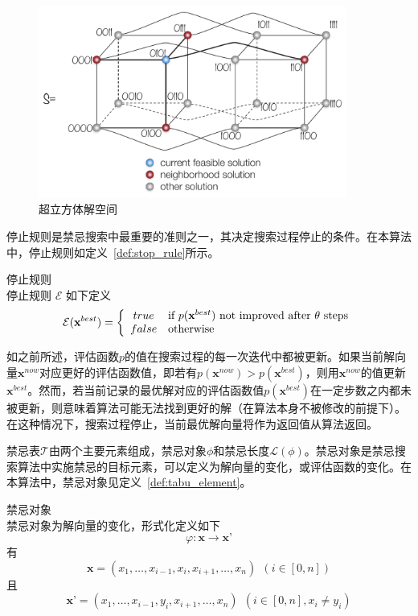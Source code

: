 \begin{figure}[!t]
\centering
\includegraphics[width=4.0in]{paper-MPAR/hypercube}
\caption{超立方体解空间}
\label{fig:chap3_hypercube}
\end{figure}

停止规则是禁忌搜索中最重要的准则之一，其决定搜索过程停止的条件。在本算法中，停止规则如定义~\ref{def:stop_rule}所示。

\begin{definition}停止规则\\
停止规则 $\mathcal{E}$ 如下定义
\[
\mathcal{E}(\textbf{x}^{best})=\left\{
\begin{array}{cl}
true & \textnormal{if $p(\textbf{x}^{best})$ not improved after $\theta$ steps} \\
false & \textnormal{otherwise}
\end{array}\right.
\]
\label{def:stop_rule}
\end{definition}

如之前所述，评估函数$p$的值在搜索过程的每一次迭代中都被更新。如果当前解向量$\bm{x}^{now}$对应更好的评估函数值，即若有$p(\bm{x}^{now})>p(\bm{x}^{best})$，则用$\bm{x}^{now}$的值更新$\bm{x}^{best}$。然而，若当前记录的最优解对应的评估函数值$p(\bm{x}^{best})$在一定步数之内都未被更新，则意味着算法可能无法找到更好的解（在算法本身不被修改的前提下）。在这种情况下，搜索过程停止，当前最优解向量将作为返回值从算法返回。

禁忌表$\mathcal{T}$由两个主要元素组成，禁忌对象$\phi$和禁忌长度$\mathcal{L}(\phi)$。禁忌对象是禁忌搜索算法中实施禁忌的目标元素，可以定义为解向量的变化，或评估函数的变化。在本算法中，禁忌对象见定义~\ref{def:tabu_element}。

\begin{definition}禁忌对象\\
禁忌对象为解向量的变化，形式化定义如下
\[
\varphi:\textbf{x}\rightarrow\textbf{x'}
\]
有
\[
\textbf{x}=(x_1,\ldots,x_{i-1},x_i,x_{i+1},\ldots,x_n)~~(i\in [0,n])
\]
且
\[
\textbf{x'}=(x_1,\ldots,x_{i-1},y_i,x_{i+1},\ldots,x_n)~~(i\in [0,n], x_i\neq y_i)
\]
\label{def:tabu_element}
\end{definition}

